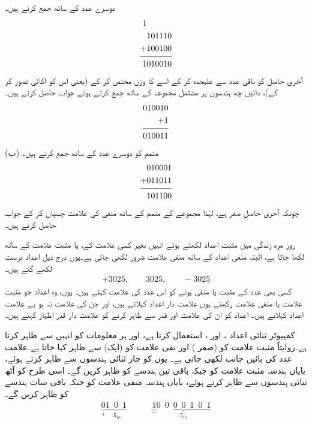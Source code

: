 دوسرے عدد کے ساتھ جمع کرتے ہیں۔
  \begin{align*}
  \begin{split}
  1\phantom{101110}&\\
 101110&\\
  +100100&\\
  \noalign{\smallskip}\hline\noalign{\smallskip}
  1010010&
  \end{split}
  \end{align*}
آخری حاصل  کو باقی عدد سے علیحدہ کر کے اسے  کا وزن مختص کر کے (یعنی اس کو    اکائی  تصور کر کے)،   دائیں چھ ہندسوں پر   مشتمل مجموعہ  کے ساتھ جمع کرتے  ہوئے  جواب حاصل کرتے ہیں۔
\begin{align*}
\begin{split}
010010&\\
+1&\\
  \noalign{\smallskip}\hline\noalign{\smallskip}
010011&
\end{split}
\end{align*}
(ب)
متمم  کو دوسرے عدد کے ساتھ جمع کرتے ہیں۔
\begin{align*}
\begin{split}
010001&\\
+011011&\\
  \noalign{\smallskip}\hline\noalign{\smallskip}
101100&
\end{split}
\end{align*}
چونکہ  آخری حاصل صفر ہے،  لہٰذا  مجموعے   کے متمم     کے ساتھ منفی کی علامت چسپاں کر کے جواب  حاصل کرتے ہیں۔
 
 
روز مرہ  زندگی میں مثبت اعداد لکھتے ہوئے انہیں بغیر کسی علامت کے،  یا  مثبت   علامت  کے ساتھ  لکھا جاتا ہے،  البتہ منفی اعداد کے ساتھ منفی علامت   ضرور لکھی جاتی ہے۔یوں   درج ذیل اعداد درست  لکھے گئے ہیں۔
\begin{align*}
+3025, \quad \quad  3025, \quad \quad  -3025
\end{align*}
کسی بھی عدد کے مثبت  یا منفی ہونے کو اس عدد کی علامت کہتے ہیں۔ یوں،  وہ اعداد جو مثبت  علامت  یا منفی  علامت    رکھتے ہوں   علامت دار  اعداد   کہلاتے ہیں،  اور جن  کی   علامت نہ ہو بے علامت اعداد کہلاتے ہیں۔ اعداد کو ان کی علامت   اور قدر  سے ظاہر کرنے  کو  علامت دار  قدر   اظہار کہتے ہیں۔ 

کمپیوٹر ثنائی اعداد ،     اور ،    استعمال کرتا ہے،  اور  ہر   معلومات کو انہیں   سے ظاہر کرتا ہے۔روایتاً    مثبت علامت  کو  (صفر )     اور نفی علامت  کو   (ایک)  سے ظاہر کیا جاتا ہے۔علامت عدد کی بائیں جانب لکھی جاتی ہے۔ یوں  کو  چار  ثنائی ہندسوں سے ظاہر کرتے ہوئے، بایاں   ہندسہ مثبت علامت  کو جبکہ باقی تین   ہندسے  کو  ظاہر کریں  گے۔ اسی طرح  کو آٹھ ثنائی   ہندسوں سے ظاہر کرتے ہوئے، بایاں ہندسہ منفی علامت  کو جبکہ باقی سات ہندسے   کو ظاہر کریں گے۔  
\begin{align*}
\underbrace{0}_{+}\underbrace{1\,\,\,0\,\,\,1}_{\,\,5_{10}}\quad \quad \quad \underbrace{1}_{-}\underbrace{0\,\,\,0\,\,\,0\,\,\,0\,\,\,1\,\,\,0\,\,\,1}_{5_{10}}
\end{align*}


